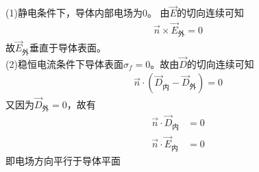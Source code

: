\documentclass{phyasgn}
\begin{document}
\begin{sol}[6]
    (1)静电条件下，导体内部电场为0。
    由$\vec{E}$的切向连续可知
    \begin{align*}
        \vec{n}\times\vec{E}_{\text{外}}=0
    \end{align*}
    故$\vec{E}_{\text{外}}$垂直于导体表面。\\
    (2)稳恒电流条件下导体表面$\sigma_f=0$。故由$\vec{D}$的切向连续可知
    \begin{align*}
        \vec{n}\cdot(\vec{D}_{\text{内}}-\vec{D}_{\text{外}})=0
    \end{align*}
    又因为$\vec{D}_{\text{外}}=0$，故有
    \begin{align*}
        \vec{n}\cdot\vec{D}_{\text{内}}&=0\\
        \vec{n}\cdot\vec{E}_{\text{内}}&=0
    \end{align*}
    即电场方向平行于导体平面
\end{sol}\par
\end{document}
